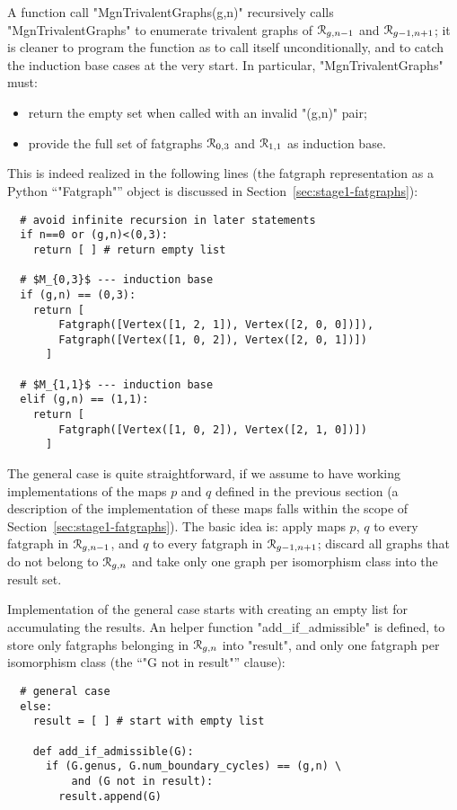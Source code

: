 A function call "MgnTrivalentGraphs(g,n)" recursively calls
"MgnTrivalentGraphs" to enumerate trivalent graphs of $\mathcal{R}_{g,n-1}$
and $\mathcal{R}_{g-1,n+1}$; it is cleaner to program the function as to call itself
unconditionally, and to catch the induction base cases at the very
start.  In particular, "MgnTrivalentGraphs" must:
\begin{itemize}
\item return the empty set when called with an invalid "(g,n)" pair;
\item provide the full set of fatgraphs $\mathcal{R}_{0,3}$ and $\mathcal{R}_{1,1}$ as
  induction base.
\end{itemize}
This is indeed realized in the following lines (the fatgraph
representation as a Python ``"Fatgraph"'' object is discussed in
Section~\ref{sec:stage1-fatgraphs}):
\begin{lstlisting}
  # avoid infinite recursion in later statements
  if n==0 or (g,n)<(0,3):
    return [ ] # return empty list

  # $M_{0,3}$ --- induction base
  if (g,n) == (0,3):
    return [ 
        Fatgraph([Vertex([1, 2, 1]), Vertex([2, 0, 0])]),
        Fatgraph([Vertex([1, 0, 2]), Vertex([2, 0, 1])]) 
      ]

  # $M_{1,1}$ --- induction base
  elif (g,n) == (1,1):
    return [ 
        Fatgraph([Vertex([1, 0, 2]), Vertex([2, 1, 0])]) 
      ]
\end{lstlisting}

The general case is quite straightforward, if we assume to have
working implementations of the maps $p$ and $q$ defined in the
previous section (a description of the implementation of these maps
falls within the scope of Section~\ref{sec:stage1-fatgraphs}).  The basic
idea is: apply maps $p$, $q$ to every fatgraph in $\mathcal{R}_{g,n-1}$, and
$q$ to every fatgraph in $\mathcal{R}_{g-1,n+1}$; discard all graphs that do
not belong to $\mathcal{R}_{g,n}$ and take only one graph per isomorphism class
into the result set.

Implementation of the general case starts with creating an empty list
for accumulating the results.  An helper function
"add_if_admissible" is defined, to store only fatgraphs belonging in
$\mathcal{R}_{g,n}$ into "result", and only one fatgraph per isomorphism
class (the ``"G not in result"'' clause):
\begin{lstlisting}
  # general case
  else:
    result = [ ] # start with empty list

    def add_if_admissible(G):
      if (G.genus, G.num_boundary_cycles) == (g,n) \
          and (G not in result):
        result.append(G)
      
\end{lstlisting}

